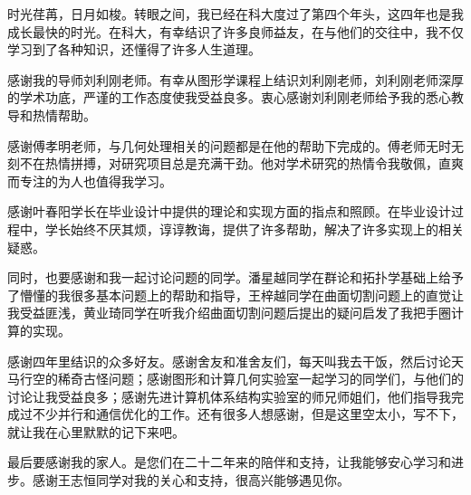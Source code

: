 
\begin{acknowledgements}

时光荏苒，日月如梭。转眼之间，我已经在科大度过了第四个年头，这四年也是我成长最快的时光。在科大，有幸结识了许多良师益友，在与他们的交往中，我不仅学习到了各种知识，还懂得了许多人生道理。

感谢我的导师刘利刚老师。有幸从图形学课程上结识刘利刚老师，刘利刚老师深厚的学术功底，严谨的工作态度使我受益良多。衷心感谢刘利刚老师给予我的悉心教导和热情帮助。

感谢傅孝明老师，与几何处理相关的问题都是在他的帮助下完成的。傅老师无时无刻不在热情拼搏，对研究项目总是充满干劲。他对学术研究的热情令我敬佩，直爽而专注的为人也值得我学习。

感谢叶春阳学长在毕业设计中提供的理论和实现方面的指点和照顾。在毕业设计过程中，学长始终不厌其烦，谆谆教诲，提供了许多帮助，解决了许多实现上的相关疑惑。

同时，也要感谢和我一起讨论问题的同学。潘星越同学在群论和拓扑学基础上给予了懵懂的我很多基本问题上的帮助和指导，王梓越同学在曲面切割问题上的直觉让我受益匪浅，黄业琦同学在听我介绍曲面切割问题后提出的疑问启发了我把手圈计算的实现。

感谢四年里结识的众多好友。感谢舍友和准舍友们，每天叫我去干饭，然后讨论天马行空的稀奇古怪问题；感谢图形和计算几何实验室一起学习的同学们，与他们的讨论让我受益良多；感谢先进计算机体系结构实验室的师兄师姐们，他们指导我完成过不少并行和通信优化的工作。还有很多人想感谢，但是这里空太小，写不下，就让我在心里默默的记下来吧。

最后要感谢我的家人。是您们在二十二年来的陪伴和支持，让我能够安心学习和进步。感谢王志恒同学对我的关心和支持，很高兴能够遇见你。

\end{acknowledgements}
